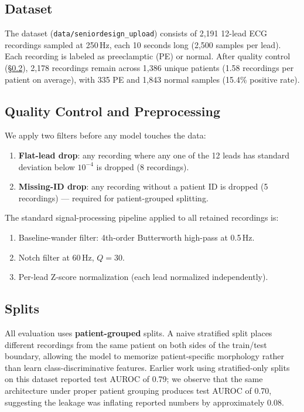 \documentclass[11pt]{article}
\begin{document}
\subsection{Dataset}

The dataset (\texttt{data/seniordesign\_upload}) consists of 2,191 12-lead ECG recordings sampled at 250\,Hz, each 10 seconds long (2,500 samples per lead). Each recording is labeled as preeclamptic (PE) or normal. After quality control (\S\ref{sec:qc}), 2,178 recordings remain across 1,386 unique patients (1.58 recordings per patient on average), with 335 PE and 1,843 normal samples (15.4\% positive rate).

\subsection{Quality Control and Preprocessing}\label{sec:qc}

We apply two filters before any model touches the data:
\begin{enumerate}
\item \textbf{Flat-lead drop}: any recording where any one of the 12 leads has standard deviation below $10^{-4}$ is dropped (8 recordings).
\item \textbf{Missing-ID drop}: any recording without a patient ID is dropped (5 recordings) — required for patient-grouped splitting.
\end{enumerate}

The standard signal-processing pipeline applied to all retained recordings is:
\begin{enumerate}
\item Baseline-wander filter: 4th-order Butterworth high-pass at 0.5\,Hz.
\item Notch filter at 60\,Hz, $Q = 30$.
\item Per-lead Z-score normalization (each lead normalized independently).
\end{enumerate}

\subsection{Splits}\label{sec:splits}

All evaluation uses \textbf{patient-grouped} splits. A naive stratified split places different recordings from the same patient on both sides of the train/test boundary, allowing the model to memorize patient-specific morphology rather than learn class-discriminative features. Earlier work using stratified-only splits on this dataset reported test AUROC of 0.79; we observe that the same architecture under proper patient grouping produces test AUROC of 0.70, suggesting the leakage was inflating reported numbers by approximately 0.08.
\end{document}
